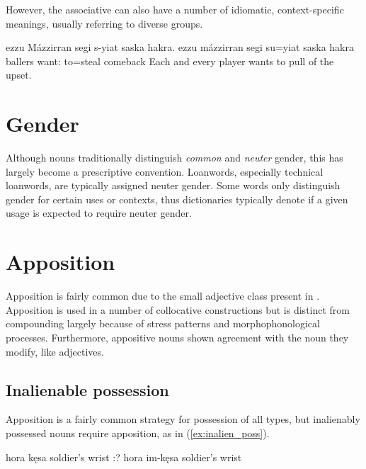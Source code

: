 However, the associative can also have a number of idiomatic, context-specific meanings, usually referring to diverse groups.

\begin{example} \label{ex:ezzu_idiom}
    \script ezzu Mázzirran segi s-yiat saska hakra.
    \bits ezzu mázzirran segi su=yiat {saska hakra}
    \gloss {} ballers want: to=steal comeback
    \tr Each and every player wants to pull of the upset.
\end{example}

\section{Gender}
Although nouns traditionally distinguish \emph{common} and \emph{neuter} gender, this has largely become a prescriptive convention.  Loanwords, especially technical loanwords, are typically assigned neuter gender. Some words only distinguish gender for certain uses or contexts, thus dictionaries typically denote if a given usage is expected to require neuter gender.

\section{Apposition}
Apposition is fairly common due to the small adjective class present in \langname{}. Apposition is used in a number of collocative constructions but is distinct from compounding largely because of stress patterns and morphophonological processes. Furthermore, appositive nouns shown agreement with the noun they modify, like adjectives.

\subsection{Inalienable possession}
Apposition is a fairly common strategy for possession of all types, but inalienably possessed nouns require apposition, as in (\ref{ex:inalien_poss}).

\begin{subexamples}
    \ex \label{ex:inalien_poss}
        \script hora kęsa
        \tr soldier's wrist
    \ex
        \script:? hora im-kęsa
        \tr soldier's wrist
\end{subexamples}

